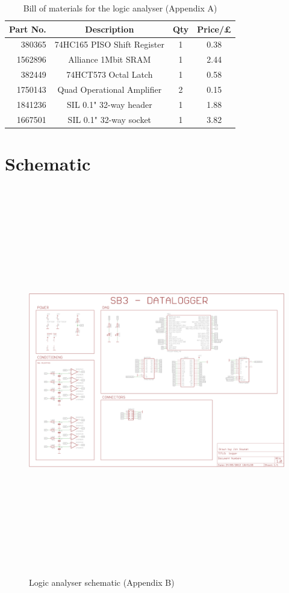 \documentclass[11pt]{article}
\begin{document}
    \begin{table}
    \begin{center}
    \begin{tabular}{|r|c|c|c|}
        \hline \textbf{Part No.} & \textbf{Description} & \textbf{Qty} & \textbf{Price/£ }  \\
        \hline 380365 & 74HC165 PISO Shift Register & 1 & 0.38 \\
        \hline 1562896 & Alliance 1Mbit SRAM & 1 & 2.44 \\
         \hline 382449 & 74HCT573 Octal Latch & 1 & 0.58 \\
        \hline 1750143 & Quad Operational Amplifier & 2 & 0.15 \\
        \hline 1841236 & SIL 0.1" 32-way header & 1 & 1.88 \\
        \hline 1667501 & SIL 0.1" 32-way socket & 1 & 3.82 \\
        \hline
    \end{tabular}
    \end{center}
    \caption{Bill of materials for the logic analyser (Appendix A)}
    \label{fig:myt}
    \end{table}

\section{Schematic}
\label{app-schematic}
			
    \begin{figure}
    \centering
    \includegraphics[height=17cm,angle=90]{../../hardware/schematic.png}
    \caption{Logic analyser schematic (Appendix B)}
    \label{fig:sch}
    \end{figure}
\end{document}
